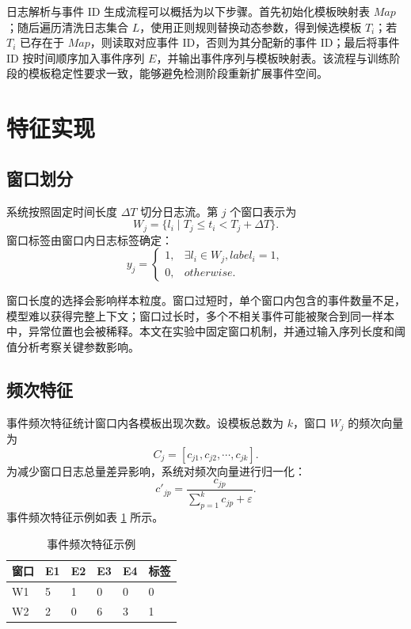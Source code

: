 日志解析与事件 ID 生成流程可以概括为以下步骤。首先初始化模板映射表 $Map$；随后遍历清洗日志集合 $L$，使用正则规则替换动态参数，得到候选模板 $T_i$；若 $T_i$ 已存在于 $Map$，则读取对应事件 ID，否则为其分配新的事件 ID；最后将事件 ID 按时间顺序加入事件序列 $E$，并输出事件序列与模板映射表。该流程与训练阶段的模板稳定性要求一致，能够避免检测阶段重新扩展事件空间。

\section{特征实现}

\subsection{窗口划分}

系统按照固定时间长度 $\Delta T$ 切分日志流。第 $j$ 个窗口表示为
\begin{equation}
    W_j=\{l_i\mid T_j\leq t_i<T_j+\Delta T\}.
\end{equation}
窗口标签由窗口内日志标签确定：
\begin{equation}
    y_j=
    \begin{cases}
    1,& \exists l_i\in W_j,label_i=1,\\
    0,& otherwise.
    \end{cases}
\end{equation}

窗口长度的选择会影响样本粒度。窗口过短时，单个窗口内包含的事件数量不足，模型难以获得完整上下文；窗口过长时，多个不相关事件可能被聚合到同一样本中，异常位置也会被稀释。本文在实验中固定窗口机制，并通过输入序列长度和阈值分析考察关键参数影响。

\subsection{频次特征}

事件频次特征统计窗口内各模板出现次数。设模板总数为 $k$，窗口 $W_j$ 的频次向量为
\begin{equation}
    C_j=[c_{j1},c_{j2},\cdots,c_{jk}].
\end{equation}
为减少窗口日志总量差异影响，系统对频次向量进行归一化：
\begin{equation}
    c'_{jp}=\frac{c_{jp}}{\sum_{p=1}^{k}c_{jp}+\varepsilon}.
\end{equation}
事件频次特征示例如表 \ref{tab:event_frequency_example_revised} 所示。

\begin{table}[htbp]
    \centering
    \caption{事件频次特征示例}
    \label{tab:event_frequency_example_revised}
    \begin{tabular}{p{2cm}p{2cm}p{2cm}p{2cm}p{2cm}p{2cm}}
        \hline
        \textbf{窗口} & \textbf{E1} & \textbf{E2} & \textbf{E3} & \textbf{E4} & \textbf{标签} \\
        \hline
        W1 & 5 & 1 & 0 & 0 & 0 \\
        W2 & 2 & 0 & 6 & 3 & 1 \\
        \hline
    \end{tabular}
\end{table}

